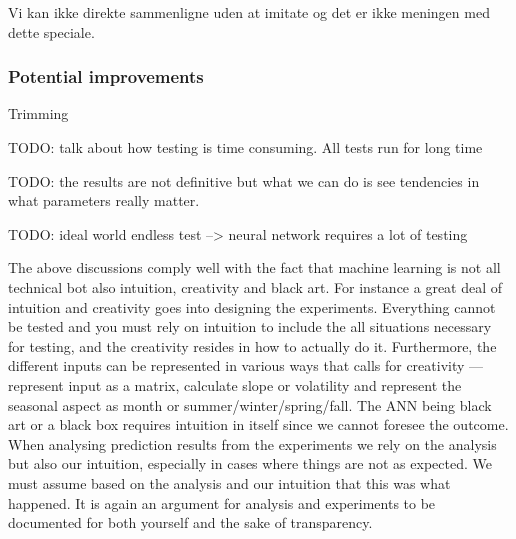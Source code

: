 Vi kan ikke direkte sammenligne uden at imitate og det er ikke meningen med dette speciale.



\subsubsection{Potential improvements}





Trimming


TODO: talk about how testing is time consuming. All tests run for long time

TODO: the results are not definitive but what we can do is see tendencies in what parameters really matter.

TODO: ideal world endless test --> neural network requires a lot of testing

The above discussions comply well with the fact that machine learning is not all technical bot also intuition, creativity and black art\cite{18}. For instance a great deal of intuition and creativity goes into designing the experiments. Everything cannot be tested and you must rely on intuition to include the all situations necessary for testing, and the creativity resides in how to actually do it. Furthermore, the different inputs can be represented in various ways that calls for creativity --- represent input as a matrix, calculate slope or volatility and represent the seasonal aspect as month or summer/winter/spring/fall. The ANN being black art or a black box requires intuition in itself since we cannot foresee the outcome. When analysing prediction results from the experiments we rely on the analysis but also our intuition, especially in cases where things are not as expected. We must assume based on the analysis and our intuition that this was what happened. It is again an argument for analysis and experiments to be documented for both yourself and the sake of transparency.





